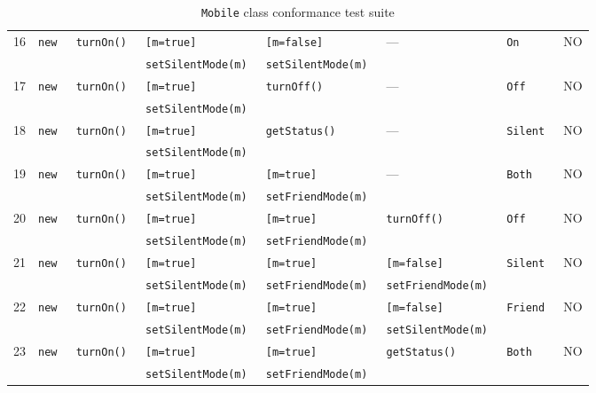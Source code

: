 \begin{table}[ht]
\begin{tabular}{|c|*{7}{l|}}
    16 & \tt new & \tt turnOn() & \tt [m=true]         & \tt [m=false] & --- & \tt On & NO \\
       &         &              & \tt setSilentMode(m) & \tt setSilentMode(m) &&& \\ \hline
    17 & \tt new & \tt turnOn() & \tt [m=true] & \tt turnOff() & --- & \tt Off & NO \\
       &         &              & \tt setSilentMode(m) &&&& \\ \hline
    18 & \tt new & \tt turnOn() & \tt [m=true] & \tt getStatus() & --- & \tt Silent & NO \\
       &         &              & \tt setSilentMode(m) &&&& \\ \hline
    19 & \tt new & \tt turnOn() & \tt [m=true]         & \tt [m=true] & --- & \tt Both & NO \\
       &         &              & \tt setSilentMode(m) & \tt setFriendMode(m) &&& \\ \hline
    20 & \tt new & \tt turnOn() & \tt [m=true]         & \tt [m=true] & \tt turnOff() & \tt Off & NO \\
       &         &              & \tt setSilentMode(m) & \tt setFriendMode(m) &&& \\ \hline
    21 & \tt new & \tt turnOn() & \tt [m=true]         & \tt [m=true]         & \tt [m=false] & \tt Silent & NO \\
       &         &              & \tt setSilentMode(m) & \tt setFriendMode(m) & \tt setFriendMode(m) && \\ \hline
    22 & \tt new & \tt turnOn() & \tt [m=true]         & \tt [m=true]         & \tt [m=false] & \tt Friend & NO \\
       &         &              & \tt setSilentMode(m) & \tt setFriendMode(m) & \tt setSilentMode(m) && \\ \hline
    23 & \tt new & \tt turnOn() & \tt [m=true]         & \tt [m=true] & \tt getStatus() & \tt Both & NO \\
       &         &              & \tt setSilentMode(m) & \tt setFriendMode(m) &&& \\ \hline
  \end{tabular}
  \caption{\texttt{Mobile} class conformance test suite}
  \label{tab:classes.mobile.conformance}
\end{table}
\clearpage

